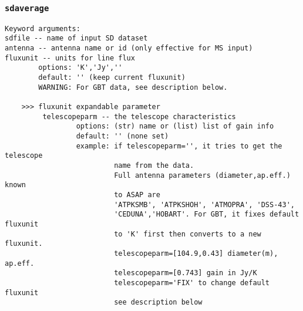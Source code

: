 \subsubsection{{\tt sdaverage}}
\label{section:sd.sdtasks.tasks.sdaverage}

\begin{verbatim}
Keyword arguments:
sdfile -- name of input SD dataset
antenna -- antenna name or id (only effective for MS input)
fluxunit -- units for line flux
        options: 'K','Jy',''
        default: '' (keep current fluxunit)
        WARNING: For GBT data, see description below.
        
    >>> fluxunit expandable parameter
         telescopeparm -- the telescope characteristics
                 options: (str) name or (list) list of gain info
                 default: '' (none set)
                 example: if telescopeparm='', it tries to get the telescope
                          name from the data.
                          Full antenna parameters (diameter,ap.eff.) known
                          to ASAP are
                          'ATPKSMB', 'ATPKSHOH', 'ATMOPRA', 'DSS-43',
                          'CEDUNA','HOBART'. For GBT, it fixes default fluxunit
                          to 'K' first then converts to a new fluxunit.
                          telescopeparm=[104.9,0.43] diameter(m), ap.eff.
                          telescopeparm=[0.743] gain in Jy/K
                          telescopeparm='FIX' to change default fluxunit
                          see description below


\end{verbatim}
